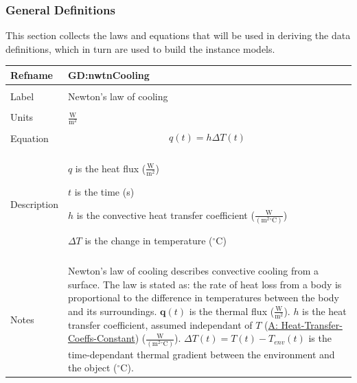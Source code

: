 \documentclass[12pt]{article}
\begin{document}
\subsubsection{General Definitions}
\label{Sec:GDs}
This section collects the laws and equations that will be used in deriving the data definitions, which in turn are used to build the instance models.
~\newline
 \noindent \begin{minipage}{\textwidth}
\begin{tabular}{p{} p{}}
\toprule \textbf{Refname} & \textbf{GD:nwtnCooling}
\label{GD:nwtnCooling}
\\ \midrule \\
Label & Newton's law of cooling
        \\ \midrule \\
        Units & $\frac{\text{W}}{\text{m}^{2}}$
                \\ \midrule \\
                Equation & \begin{dmath}
                           q\left(t\right)=h ΔT\left(t\right)
                           \end{dmath}
                           \\ \midrule \\
                           Description & \begin{symbDescription}
                                         \item{$q$ is the heat flux ($\frac{\text{W}}{\text{m}^{2}}$)}
                                         \item{$t$ is the time (s)}
                                         \item{$h$ is the convective heat transfer coefficient ($\frac{\text{W}}{(\text{m}^{2}{}^{\circ}\text{C})}$)}
                                         \item{$ΔT$ is the change in temperature (${}^{\circ}$C)}
                                         \end{symbDescription}
                                         \\ \midrule \\
                                         Notes & Newton's law of cooling describes convective cooling from a surface. The law is stated as: the rate of heat loss from a body is proportional to the difference in temperatures between the body and its surroundings. $\mathbf{q}\left(t\right)$ is the thermal flux ($\frac{\text{W}}{\text{m}^{2}}$). $h$ is the heat transfer coefficient, assumed independant of $T$ (\hyperref[A:Heat-Transfer-Coeffs-Constant]{A: Heat-Transfer-Coeffs-Constant}) ($\frac{\text{W}}{(\text{m}^{2}{}^{\circ}\text{C})}$). $ΔT\left(t\right)=T\left(t\right)-{T_{env}}\left(t\right)$ is the time-dependant thermal gradient between the environment and the object (${}^{\circ}$C).

\end{tabular}
\end{minipage}
\end{document}

